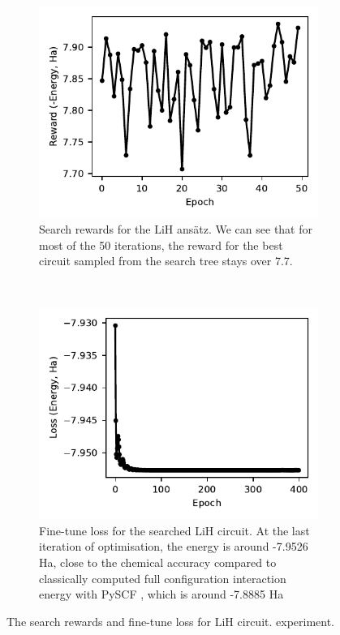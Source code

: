 \documentclass{ieeeaccess}
\begin{document}
\begin{figure}[ht!]
    \centering
    \begin{subfigure}[t]{0.4\linewidth}
        \includegraphics[width=\linewidth]{peiyong_fig_11.pdf}
        \caption{Search rewards for the $\text{LiH}$ ans\"atz. We can see that for most of the 50 iterations, the reward for the best circuit sampled from the search tree stays over 7.7.}
        \label{fig:lih_search}
    \end{subfigure}
    ~ %
    \begin{subfigure}[t]{0.4\linewidth}
        \includegraphics[width=\linewidth]{peiyong_fig_12.pdf}
        \caption{Fine-tune loss for the searched $\text{LiH}$ circuit. At the last iteration of optimisation, the energy is around -7.9526 Ha, close to the chemical accuracy compared to classically computed full configuration interaction energy with PySCF \cite{Sun2018-nq, Sun2020-ej}, which is around -7.8885 Ha}
        \label{fig:lih_finetune}
    \end{subfigure}
    \caption{The search rewards and fine-tune loss for $\text{LiH}$ circuit. experiment.}\label{fig:lih_search_finetune}
\end{figure}
\end{document}
